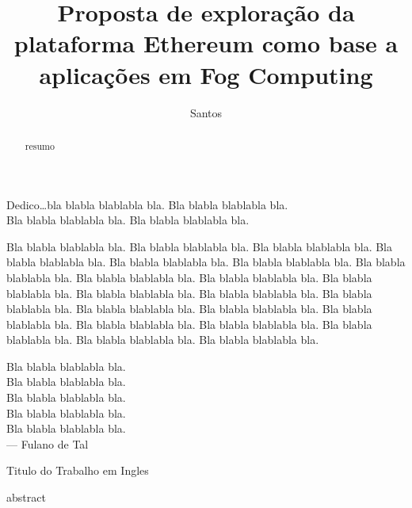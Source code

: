 \documentclass[tcc,capa]{texufpel}
\title{Proposta de exploração da plataforma Ethereum como base a aplicações em Fog Computing}
\author{Santos}{Gustavo Fernandes dos}
\begin{document}
\renewcommand{\advisorname}{Orientadora}           %

\newcommand{\bchain}{\textit{blockchain} }
\newcommand{\Bchain}{\textit{Blockchain} }

\maketitle 

\sloppy

\fichacatalografica

\folhadeaprovacao

\begin{dedicatoria}
  Dedico\ldots bla blabla blablabla bla. Bla blabla blablabla bla.\\
  Bla blabla blablabla bla. Bla blabla blablabla bla.
\end{dedicatoria}

\begin{agradecimentos}
  Bla blabla blablabla bla.  Bla blabla blablabla bla.  Bla blabla blablabla
  bla.  Bla blabla blablabla bla.  Bla blabla blablabla bla.  Bla blabla
  blablabla bla.  Bla blabla blablabla bla.  Bla blabla blablabla bla.  Bla
  blabla blablabla bla.  Bla blabla blablabla bla.  Bla blabla blablabla bla.
  Bla blabla blablabla bla.  Bla blabla blablabla bla.  Bla blabla blablabla
  bla.  Bla blabla blablabla bla.  Bla blabla blablabla bla.  Bla blabla
  blablabla bla.  Bla blabla blablabla bla.  Bla blabla blablabla bla.  Bla
  blabla blablabla bla.  Bla blabla blablabla bla.
\end{agradecimentos}

\begin{epigrafe}
  Bla blabla blablabla bla.\\
  Bla blabla blablabla bla.\\
  Bla blabla blablabla bla.\\
  Bla blabla blablabla bla.\\
  Bla blabla blablabla bla.\\
  {\sc --- Fulano de Tal}
\end{epigrafe}

\begin{abstract}
  resumo
\end{abstract}

\begin{englishabstract}%
  {Titulo do Trabalho em Ingles}
  
	abstract
\end{englishabstract}
\end{document}
